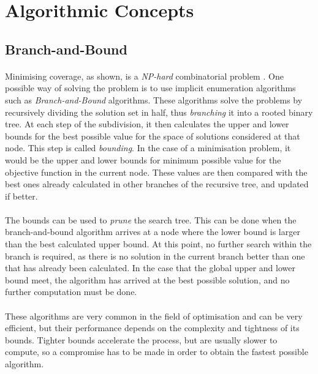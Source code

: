 \section{Algorithmic Concepts}
\subsection{Branch-and-Bound}
\paragraph{}
Minimising coverage, as shown, is a \emph{NP-hard} combinatorial problem \cite{complex}. One possible way of solving the problem is to use implicit enumeration algorithms such as \emph{Branch-and-Bound} algorithms.
These algorithms solve the problems by recursively dividing the solution set in half, thus \emph{branching} it into a rooted binary tree.
At each step of the subdivision, it then calculates the upper and lower bounds for the best possible value for the space of solutions considered at that node. This step is called \emph{bounding}.
In the case of a minimisation problem, it would be the upper and lower bounds for minimum possible value for the objective function in the current node. These values are then compared with the best ones already calculated in other branches of the recursive tree, and updated if better.
\paragraph{}
The bounds can be used to \emph{prune} the search tree. This can be done when the branch-and-bound algorithm arrives at a node where the lower bound is larger than the best calculated upper bound. At this point, no further search within the branch is required, as there is no solution in the current branch better than one that has already been calculated. 
In the case that the global upper and lower bound meet, the algorithm has arrived at the best possible solution, and no further computation must be done.

\paragraph{}
These algorithms are very common in the field of optimisation and can be very efficient, but their performance depends on the complexity and tightness of its bounds. Tighter bounds accelerate the process, but are usually slower to compute, so a compromise has to be made in order to obtain the fastest possible algorithm.

